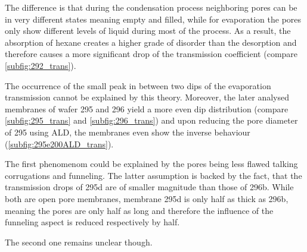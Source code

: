 \documentclass[../thesis.tex]{subfiles}
\begin{document}
                The difference is that during the condensation process neighboring pores can be in very different states meaning empty and filled, while for evaporation the pores only show different levels of liquid during most of the process. As a result, the absorption of hexane creates a higher grade of disorder than the desorption and therefore causes a more significant drop of the transmission coefficient (compare \cref{subfig:292_trans}).
                \medskip

                The occurrence of the small peak in between two dips of the evaporation transmission cannot be explained by this theory. Moreover, the later analysed membranes of wafer 295 and 296 yield a more even dip distribution (compare \cref{subfig:295_trans} and \cref{subfig:296_trans}) and upon reducing the pore diameter of 295 using ALD, the membranes even show the inverse behaviour (\cref{subfig:295e200ALD_trans}).

                The first phenomenom could be explained by the pores being less flawed talking corrugations and funneling. The latter assumption is backed by the fact, that the transmission drops of 295d are of smaller magnitude than those of 296b. While both are open pore membranes, membrane 295d is only half as thick as 296b, meaning the pores are only half as long and therefore the influence of the funneling aspect is reduced respectively by half.

                The second one remains unclear though.

                
\end{document}
